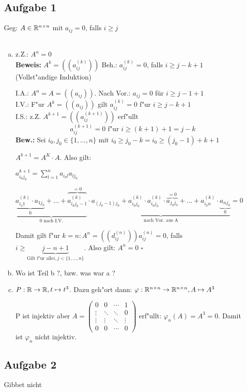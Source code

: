 \documentclass[a4paper,twoside,DIV15,BCOR12mm]{scrbook}
\newcommand{\enua}{\ \begin{enumerate}[a)]}
\newcommand{\une}{\end{enumerate}}
\newcommand{\x}{\cdot}
\newenvironment{bew}{\pagebreak[2]\textbf{Beweis: }}{\qed}
\renewcommand{\qed}{\hspace*{\fill} \ensuremath{\square}}
\begin{document}
\subsection {Aufgabe 1}
Geg: $A\in\mathbb{R}^{n\times n}$ mit $a_{ij}=0$, falls $i\ge j$\\
\enua
\item z.Z.: $A^n=0$\\
\begin{bew}$A^k=((a_{ij}^{(k)}))$ Beh.: $a_{ij}^{(k)}=0$, falls $i\ge j-k+1$\\
(Vollst"andige Induktion)\par
I.A.: $A^n=A=((a_{ij}))$. Nach Vor.: $a_{ij}=0$ für $i\ge j-1+1$\\
I.V.: F"ur $A^k=((a_{ij}))$ gilt $a_{ij}^{(k)}=0$ f"ur $i\ge j-k+1$\\
I.S.: z.Z. $A^{k+1}=((a_{ij}^{(k+1)}))$ erf"ullt
\[a_{ij}^{(k+1)}=0\mbox{ f"ur }i\ge(k+1)+1=j-k\]
\textbf{Bew.:} Sei $i_0,j_0\in\{1,...,n\}$ mit $i_0\ge j_0-k=i_0\ge (j_0-1)+k+1$\par
$A^{k+1}=A^K\x A.$ Also gilt:\par
$a_{i_0j_0}^{k+1}=\sum\limits_{l=1}^n{a_{i_0l}a_{lj_0}}$\par
$\underbrace{\underbrace{a_{i_o1}^{(k)}\x a_{1j_0}}_0
+...
+\overbrace{a_{i_0j_0-1}^{(k)}}^{=0}}_{\text{0 nach I.V.}}\x\underbrace{a_{(j_0-1)j_0}
+a_{i_0j_0}^{(k)}\x a_{i_0j_0}^{(k)}\x \overbrace{a_{j_0j_0}}^{=0}
+...
+a_{i_0n}^{(k)}\x \underbrace{a_{nj_0}}_0}_{\text{nach Vor. aus A}}
=0$\par
Damit gilt f"ur $k=n: A^n=((d_{ij}^{(n)}))a_{ij}^{(n)}=0$, falls $i\ge \underbrace{j-n+1}_{\text{Gilt f"ur alle}i,j<\{1,...,n\}}$. Also gilt: $A^n=0$
\end{bew}
\item Wo ist Teil b ?, bzw. was war a ?
\item $P: \mathbb{R}\to\mathbb{R}, t\mapsto t^3$. Dazu geh"ort dann: $\varphi: \mathbb{R}^{n\times n}\to\mathbb{R}^{n\times n}, A\mapsto A^3$\par
P ist injektiv aber $A=\begin{pmatrix}
0 & 0 & \cdots & 1\\
\vdots & \ddots & \ddots & 0\\
\vdots & \vdots & \ddots & \vdots\\
0 & 0 & \cdots & 0
\end{pmatrix}$ erf"ullt: $\varphi_n(A)=A^3=0$. Damit ist $\varphi_n$ nicht injektiv.
\une
\subsection{Aufgabe 2}
Gibbet nicht
\end{document}
